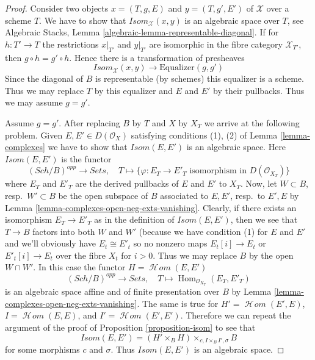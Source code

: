 \documentclass[10pt,a4paper]{amsart}
\theoremstyle{plain}
\theoremstyle{definition}
\theoremstyle{remark}
\numberwithin{equation}{subsection}
\def\Hom{\mathop{\mathrm{Hom}}\nolimits}
\def\SheafHom{\mathop{\mathcal{H}\!\mathit{om}}\nolimits}
\def\Sch{\mathit{Sch}}
\begin{document}
\begin{proof}
Consider two objects $x = (T, g, E)$ and $y = (T, g', E')$
of $\mathcal{X}$ over a scheme $T$. We have to show that
$\mathit{Isom}_\mathcal{X}(x, y)$ is an algebraic space over $T$, see
Algebraic Stacks, Lemma \ref{algebraic-lemma-representable-diagonal}.
If for $h : T' \to T$ the restrictions $x|_{T'}$ and $y|_{T'}$ are isomorphic
in the fibre category $\mathcal{X}_{T'}$, then $g \circ h = g' \circ h$.
Hence there is a transformation of presheaves
$$
\mathit{Isom}_\mathcal{X}(x, y) \longrightarrow \text{Equalizer}(g, g')
$$
Since the diagonal of $B$ is representable (by schemes) this equalizer is
a scheme. Thus we may replace $T$ by this equalizer and
$E$ and $E'$ by their pullbacks. Thus we may assume $g = g'$.

\medskip\noindent
Assume $g = g'$. After replacing $B$ by $T$ and $X$ by $X_T$ we arrive
at the following problem. Given $E, E' \in D(\mathcal{O}_X)$
satisfying conditions (1), (2) of Lemma \ref{lemma-complexes}
we have to show that $\mathit{Isom}(E, E')$ is an algebraic space.
Here $\mathit{Isom}(E, E')$ is the functor
$$
(\Sch/B)^{opp} \to \textit{Sets},\quad
T \mapsto \{\varphi : E_T \to E'_T
\text{ isomorphism in }D(\mathcal{O}_{X_T})\}
$$
where $E_T$ and $E'_T$ are the derived pullbacks of $E$ and $E'$
to $X_T$. Now, let $W \subset B$, resp.\ $W' \subset B$ be the
open subspace of $B$ associated
to $E, E'$, resp.\ to $E', E$ by
Lemma \ref{lemma-complexes-open-neg-exts-vanishing}.
Clearly, if there exists an isomorphism $E_T \to E'_T$ as in
the definition of $\mathit{Isom}(E, E')$, then we see that
$T \to B$ factors into both $W$ and $W'$ (because we have
condition (1) for $E$ and $E'$ and we'll obviously have
$E_t \cong E'_t$ so no nonzero maps $E_t[i] \to E_t$
or $E'_t[i] \to E_t$ over the fibre $X_t$ for $i > 0$.
Thus we may replace $B$ by the open $W \cap W'$.
In this case the functor $H = \SheafHom(E, E')$
$$
(\Sch/B)^{opp} \to \textit{Sets},\quad T \mapsto
\Hom_{\mathcal{O}_{X_T}}(E_T, E'_T)
$$
is an algebraic space affine and of finite presentation over $B$ by
Lemma \ref{lemma-complexes-open-neg-exts-vanishing}.
The same is true for
$H' = \SheafHom(E', E)$,
$I = \SheafHom(E, E)$, and
$I' = \SheafHom(E', E')$.
Therefore we can repeat the argument of the proof of
Proposition \ref{proposition-isom} to see that
$$
\mathit{Isom}(E, E') = (H' \times_B H) \times_{c, I \times_B I', \sigma} B
$$
for some morphisms $c$ and $\sigma$. Thus
$\mathit{Isom}(E, E')$ is an algebraic space.
\end{proof}
\end{document}
